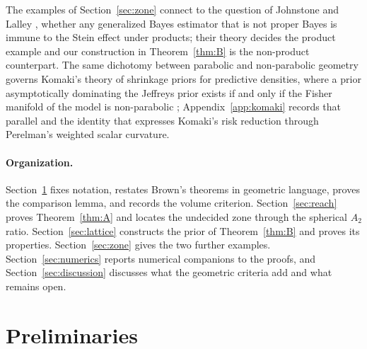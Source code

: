 \documentclass[11pt]{amsart}
\theoremstyle{plain}
\theoremstyle{definition}
\theoremstyle{remark}
\begin{document}
The examples of Section~\ref{sec:zone} connect to the question of Johnstone and
Lalley \cite{johnstonelalley1984}, whether any generalized Bayes estimator that
is not proper Bayes is immune to the Stein effect under products; their theory
decides the product example and our construction in Theorem~\ref{thm:B} is the
non-product counterpart. The same dichotomy between parabolic and non-parabolic
geometry governs Komaki's theory of shrinkage priors for predictive densities,
where a prior asymptotically dominating the Jeffreys prior exists if and only if
the Fisher manifold of the model is non-parabolic \cite{komaki2006};
Appendix~\ref{app:komaki} records that parallel and the identity that expresses
Komaki's risk reduction through Perelman's weighted scalar curvature.

\paragraph{Organization.} Section~\ref{sec:prelim} fixes notation, restates
Brown's theorems in geometric language, proves the comparison lemma, and records
the volume criterion. Section~\ref{sec:reach} proves Theorem~\ref{thm:A} and
locates the undecided zone through the spherical $A_2$ ratio.
Section~\ref{sec:lattice} constructs the prior of Theorem~\ref{thm:B} and proves
its properties. Section~\ref{sec:zone} gives the two further examples.
Section~\ref{sec:numerics} reports numerical companions to the proofs, and
Section~\ref{sec:discussion} discusses what the geometric criteria add and what
remains open.

\section{Preliminaries}\label{sec:prelim}
\end{document}
